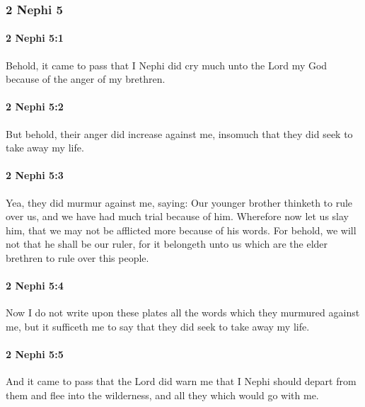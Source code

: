 	\subsubsection{2 Nephi 5} %
		\label{2NEPHI-5}
		
		\paragraph{2 Nephi 5:1} %
			\label{2NEPHI-5-1}

			Behold, it came to pass that I Nephi did cry much unto the Lord my God
			because of the anger of my brethren.

		\paragraph{2 Nephi 5:2} %
			\label{2NEPHI-5-2}

			But behold, their anger did increase against me,
			insomuch that they did seek to take away my life.

		\paragraph{2 Nephi 5:3} %
			\label{2NEPHI-5-3}

			Yea, they did murmur against me, saying:
			Our younger brother thinketh to rule over us,
			and we have had much trial because of him.
			Wherefore now let us slay him,
			that we may not be afflicted more because of his words.
			For behold, we will not that he shall be our ruler,
			for it belongeth unto us which are the elder brethren to rule over this people.

		\paragraph{2 Nephi 5:4} %
			\label{2NEPHI-5-4}

			Now I do not write upon these plates all the words
			which they murmured against me,
			but it sufficeth me to say that they did seek to take away my life.

		\paragraph{2 Nephi 5:5} %
			\label{2NEPHI-5-5}

			And it came to pass that the Lord did warn me
			that I Nephi should depart from them and flee into the wilderness,
			and all they which would go with me.

